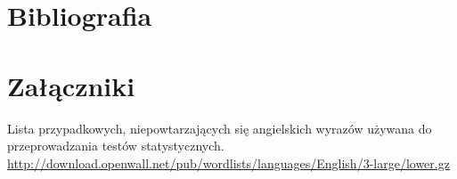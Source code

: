 \documentclass[12pt,a4paper,twoside]{article}
\newcounter{attcounter} %
\begin{document}
\section{Bibliografia}



\section{Załączniki}

\begin{myenumerate}
\item {}\label{att:english_wordlist}Lista
przypadkowych, niepowtarzających się angielskich wyrazów używana do
przeprowadzania testów statystycznych.
\url{http://download.openwall.net/pub/wordlists/languages/English/3-large/lower.gz}
\end{myenumerate}
\end{document}
